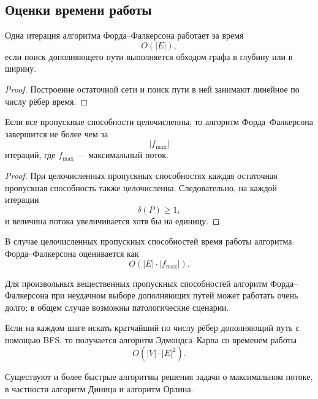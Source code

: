 \subsection{Оценки времени работы}

\begin{Proposition}{}{}
	Одна итерация алгоритма Форда--Фалкерсона работает за время
	\[
	O(|E|),
	\]
	если поиск дополняющего пути выполняется обходом графа в глубину или в ширину.
\end{Proposition}

\begin{proof}
	Построение остаточной сети и поиск пути в ней занимают линейное по числу рёбер время.
\end{proof}

\begin{Proposition}{}{}
	Если все пропускные способности целочисленны, то алгоритм Форда--Фалкерсона завершится не более чем за
	\[
	|f_{\max}|
	\]
	итераций, где $f_{\max}$ --- максимальный поток.
\end{Proposition}

\begin{proof}
	При целочисленных пропускных способностях каждая остаточная пропускная способность также целочисленна. Следовательно, на каждой итерации
	\[
	\delta(P)\ge 1,
	\]
	и величина потока увеличивается хотя бы на единицу.
\end{proof}

\begin{Corollary}{}{}
	В случае целочисленных пропускных способностей время работы алгоритма Форда--Фалкерсона оценивается как
	\[
	O(|E|\cdot |f_{\max}|).
	\]
\end{Corollary}

\begin{Remark}{}{}
	Для произвольных вещественных пропускных способностей алгоритм Форда--Фалкерсона при неудачном выборе дополняющих путей может работать очень долго; в общем случае возможны патологические сценарии.
\end{Remark}

\begin{Statement}{}{}
	Если на каждом шаге искать кратчайший по числу рёбер дополняющий путь с помощью BFS, то получается алгоритм Эдмондса--Карпа со временем работы
	\[
	O(|V|\cdot |E|^2).
	\]
\end{Statement}

\begin{Remark}{}{}
	Существуют и более быстрые алгоритмы решения задачи о максимальном потоке, в частности алгоритм Диница и алгоритм Орлина.
\end{Remark}
